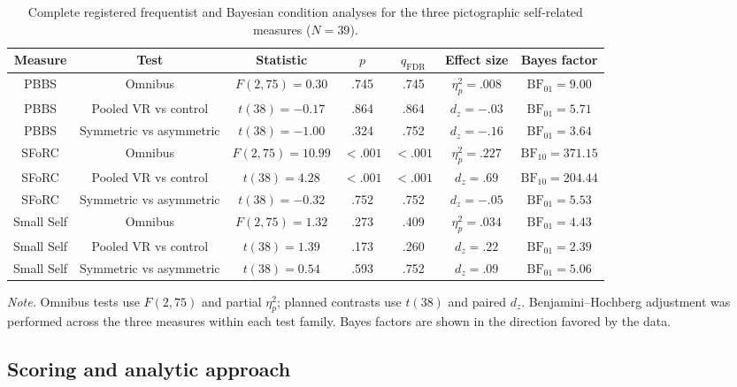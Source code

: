\documentclass[pdflatex,sn-basic,lineno]{../sn-jnl}
\begin{document}
\begin{table}[!htbp]
\centering
\scriptsize
\setlength{\tabcolsep}{0.5pt}
\caption{Complete registered frequentist and Bayesian condition analyses for the three pictographic self-related measures ($N=39$).}
\label{tab:supp_self_condition_complete}
\begin{tabular*}{\textwidth}{@{\extracolsep{\fill}}ccccccc@{}}
\toprule
Measure & Test & Statistic & $p$ & $q_{\mathrm{FDR}}$ & Effect size & Bayes factor \\
\midrule
PBBS & Omnibus & $F(2,75)=0.30$ & .745 & .745 & $\eta_p^2=.008$ & $\mathrm{BF}_{01}=9.00$ \\
PBBS & Pooled VR vs control & $t(38)=-0.17$ & .864 & .864 & $d_z=-.03$ & $\mathrm{BF}_{01}=5.71$ \\
PBBS & Symmetric vs asymmetric & $t(38)=-1.00$ & .324 & .752 & $d_z=-.16$ & $\mathrm{BF}_{01}=3.64$ \\
SFoRC & Omnibus & $F(2,75)=10.99$ & $<.001$ & $<.001$ & $\eta_p^2=.227$ & $\mathrm{BF}_{10}=371.15$ \\
SFoRC & Pooled VR vs control & $t(38)=4.28$ & $<.001$ & $<.001$ & $d_z=.69$ & $\mathrm{BF}_{10}=204.44$ \\
SFoRC & Symmetric vs asymmetric & $t(38)=-0.32$ & .752 & .752 & $d_z=-.05$ & $\mathrm{BF}_{01}=5.53$ \\
Small Self & Omnibus & $F(2,75)=1.32$ & .273 & .409 & $\eta_p^2=.034$ & $\mathrm{BF}_{01}=4.43$ \\
Small Self & Pooled VR vs control & $t(38)=1.39$ & .173 & .260 & $d_z=.22$ & $\mathrm{BF}_{01}=2.39$ \\
Small Self & Symmetric vs asymmetric & $t(38)=0.54$ & .593 & .752 & $d_z=.09$ & $\mathrm{BF}_{01}=5.06$ \\
\bottomrule
\end{tabular*}
\parbox{\textwidth}{\footnotesize\textit{Note.} Omnibus tests use $F(2,75)$ and partial $\eta_p^2$; planned contrasts use $t(38)$ and paired $d_z$. Benjamini--Hochberg adjustment was performed across the three measures within each test family. Bayes factors are shown in the direction favored by the data.}
\end{table}
\FloatBarrier

\subsection{Scoring and analytic approach}
\end{document}
